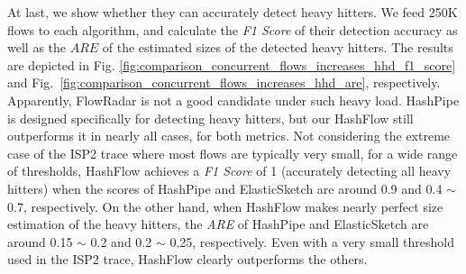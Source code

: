 At last, we show whether they can accurately detect heavy hitters.
We feed 250K flows to each algorithm, and calculate the \emph{F1 Score} of their detection accuracy as well as the $ARE$ of the estimated sizes of the detected heavy hitters.
The results are depicted in Fig. \ref{fig:comparison_concurrent_flows_increases_hhd_f1_score} 
and Fig.~\ref{fig:comparison_concurrent_flows_increases_hhd_are}, respectively. 
Apparently, FlowRadar is not a good candidate under such heavy load. 
HashPipe is designed specifically for detecting heavy hitters, 
but our HashFlow still outperforms it in nearly all cases, for both metrics. 
Not considering the extreme case of the ISP2 trace where most flows are typically very small, 
for a wide range of thresholds, HashFlow achieves a \emph{F1 Score} of 1 (accurately detecting all heavy hitters) 
when the scores of HashPipe and ElasticSketch are around 0.9 and 0.4 $\sim$ 0.7, respectively. 
On the other hand, when HashFlow makes nearly perfect size estimation of the heavy hitters, 
the \emph{ARE} of HashPipe and ElasticSketch are around 0.15 $\sim$ 0.2 and 0.2 $\sim$ 0.25, respectively.
Even with a very small threshold used in the ISP2 trace, HashFlow clearly outperforms the others.

